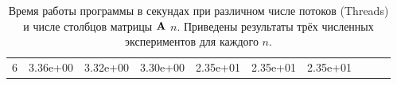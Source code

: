 \begin{table}[]
\begin{adjustbox}{angle=90}
\begin{tabular}{|c|ccc|ccc|ccc}
6                                         & \multicolumn{1}{c|}{3.36e+00} & \multicolumn{1}{c|}{3.32e+00} & 3.30e+00 & \multicolumn{1}{c|}{2.35e+01} & \multicolumn{1}{c|}{2.35e+01} & 2.35e+01 & \multicolumn{1}{l}{}          & \multicolumn{1}{l}{}          & \multicolumn{1}{l}{}          \\ \cline{1-7}
\end{tabular}
\end{adjustbox}
\caption{Время работы программы в секундах при различном числе потоков (Threads) и числе столбцов матрицы $\vb{A}$ $n$. Приведены результаты трёх численных экспериментов для каждого $n$.}
\label{tab:2}
\end{table}